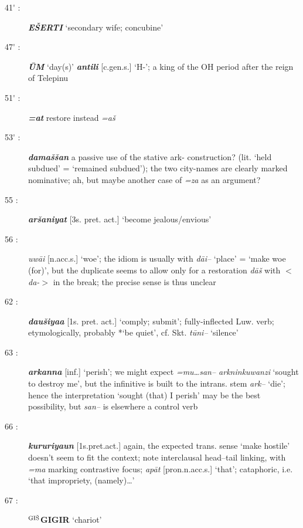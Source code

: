 \documentclass[10pt]{article}
\newcommand{\supersc}[1]{$^{\textrm{\scriptsize{#1}}}$}  	%
\newcommand{\bit}[1]{\textbf{\textit{#1}}}				%
\newcommand{\p}[1]{{\tiny[{#1}]}}					%
\newcommand{\pr}{\'{ }}									%
\newcommand{\hith}{\textsubwedge{h}}
\newcommand{\Hith}{\textsubwedge{H}}
\newcommand{\wood}{\supersc{GI\v{S}}}
\renewcommand{\.}[1]{\textsubdot{#1}}
\begin{document}
\begin{description}
\item[41{\pr} :] \bit{E\v{S}ERTI} `secondary wife; concubine' 

\item[47{\pr} :] \bit{\=UM} `day(s)' \bit{{\Hith}antili} \p{c.gen.s.} `H-'; a king of the OH period after the reign of Telepinu 

\item[51{\pr} :] \bit{=at} restore instead \textit{=a\v{s}}

\item[53{\pr} :] \bit{dama\v{s}\v{s}an} a passive use of the stative {\hith}ark- construction? (lit. `held subdued' = `remained subdued'); the two city-names are clearly marked nominative; ah, but maybe another case of \textit{=za} as an argument?

\item[55 :] \bit{ar\v{s}aniyat} \p{3s. pret. act.} `become jealous/envious'

\item[56 :] \textit{uw\=ai} \p{n.acc.s.} `woe'; the idiom is usually with \textit{d\=ai--} `place' = `make woe (for)', but the duplicate seems to allow only for a restoration \textit{d\=a\v{s}} with $<$\textit{da-}$>$ in the break; the precise sense is thus unclear

\item[62 :] \bit{da{\hith}u\v{s}iya{\hith\hith}a} \p{1s. pret. act.} `comply; submit'; fully-inflected Luw. verb; etymologically, probably {*}`be quiet', cf. Skt. \textit{t\=u\.{s}ni--} `silence'


\item[63 :] \bit{{\hith}arkanna} \p{inf.} `perish'; we might expect \textit{=mu{\ldots}san{\hith}-- {\hith}arkninkuwanzi} `sought to destroy me', but the infinitive is built to the intrans. stem \textit{{\hith}ark--} `die'; hence the interpretation `sought (that) I perish' may be the best possibility, but \textit{san{\hith}--} is elsewhere a control verb

\item[66 :] \bit{kururiya{\hith}{\hith}un} \p{1s.pret.act.} again, the expected trans. sense `make hostile' doesn't seem to fit the context; note interclausal head--tail linking, with \textit{=ma} marking contrastive focus; \textit{ap\=at} \p{pron.n.acc.s.} `that'; cataphoric, i.e. `that impropriety, (namely){\ldots}'

\item[67 :] \textbf{{\wood}GIGIR} `chariot'


\end{description}
\end{document}
